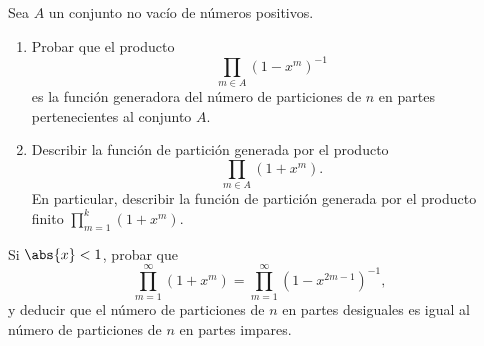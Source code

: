 \documentclass[12pt,a4paper]{book}
\begin{document}
    \begin{ejercicio}
        Sea $A$ un conjunto no vacío de números positivos.
        \begin{enumerate}
            \item[(a)] Probar que el producto
            \begin{equation*}
                \prod_{m\in A}(1-x^{m})^{-1}
            \end{equation*}
            es la función generadora del número de particiones de $n$ en partes pertenecientes
            al conjunto $A$.
            \item[(b)] Describir la función de partición generada por el producto
            \begin{equation*}
                \prod_{m\in A}(1+x^{m}).
            \end{equation*}
            En particular, describir la función de partición generada por el producto finito
            $\prod_{m=1}^{k}(1+x^{m})$.
        \end{enumerate}
    \end{ejercicio}

    \begin{ejercicio}
        Si $\abs{x}<1$, probar que
        \begin{equation*}
            \prod_{m=1}^{\infty}(1+x^{m})=\prod_{m=1}^{\infty}(1-x^{2m-1})^{-1},
        \end{equation*}
        y deducir que el número de particiones de $n$ en partes desiguales es igual al número
        de particiones de $n$ en partes impares.
    \end{ejercicio}
\end{document}
